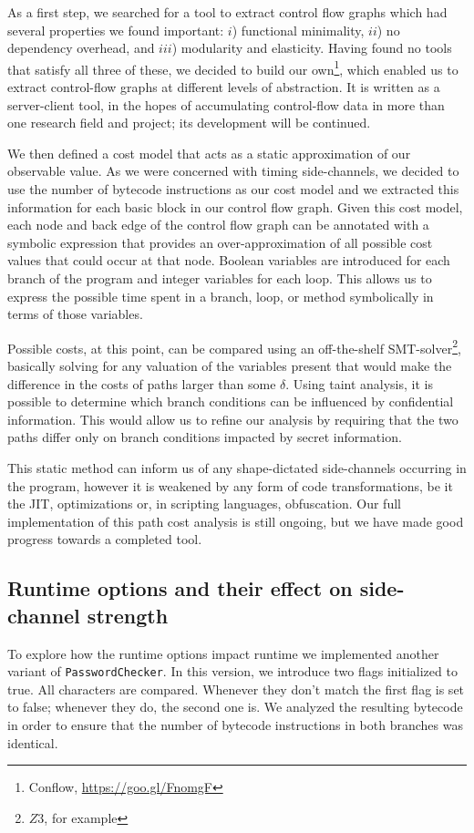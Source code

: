 As a first step, we searched for a tool to extract control flow graphs which had several properties we found important: $i$) functional minimality, $ii$) no dependency overhead, and $iii$) modularity and elasticity. Having found no tools that satisfy all three of these, we decided to build our own\footnote{Conflow, \href{https://goo.gl/FnomgF}{https://goo.gl/FnomgF}}, which enabled us to extract control-flow graphs at different levels of abstraction. It is written as a server-client tool, in the hopes of accumulating control-flow data in more than one research field and project; its development will be continued.

We then defined a cost model that acts as a static approximation of our observable value. As we were concerned with timing side-channels, we decided to use the number of bytecode instructions as our cost model and we extracted this information for each basic block in our control flow graph. Given this cost model, each node and back edge of the control flow graph can be annotated with a symbolic expression that provides an over-approximation of all possible cost values that could occur at that node. Boolean variables are introduced for each branch of the program and integer variables for each loop. This allows us to express the possible time spent in a branch, loop, or method symbolically in terms of those variables. 

Possible costs, at this point, can be compared using an off-the-shelf SMT-solver\footnote{$Z3$, for example}, basically solving for any valuation of the variables present that would make the difference in the costs of paths larger than some $\delta$. Using taint analysis, it is possible to determine which branch conditions can be influenced by confidential information. This would allow us to refine our analysis by requiring that the two paths differ only on branch conditions impacted by secret information. 

This static method can inform us of any shape-dictated side-channels occurring in the program, however it is weakened by any form of code transformations, be it the JIT, optimizations or, in scripting languages, obfuscation. Our full implementation of this path cost analysis is still ongoing, but we have made good progress towards a completed tool. 



\subsection{Runtime options and their effect on side-channel strength}
To explore how the runtime options impact runtime we implemented another variant of \texttt{PasswordChecker}. In this version, we introduce two flags initialized to true. All characters are compared. Whenever they don't match the first flag is set to false; whenever they do, the second one is. We analyzed the resulting bytecode in order to ensure that the number of bytecode instructions in both branches was identical. 

